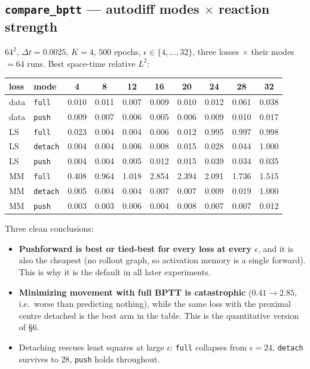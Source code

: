 \documentclass[11pt]{article}
\newcommand{\dt}{\Delta t}
\begin{document}
\subsection{\texttt{compare\_bptt} --- autodiff modes $\times$ reaction strength}
\label{sec:exp-bptt}
$64^2$, $\dt=0.0025$, $K=4$, $500$ epochs, $\epsilon\in\{4,\dots,32\}$, three losses $\times$ their
modes $=64$ runs. Best space-time relative $L^2$:
\begin{center}
\begin{tabular}{llcccccccc}
\hline
loss & mode & 4 & 8 & 12 & 16 & 20 & 24 & 28 & 32 \\
\hline
data & \texttt{full}   & 0.010 & 0.011 & 0.007 & 0.009 & 0.010 & 0.012 & 0.061 & 0.038 \\
data & \texttt{push}   & 0.009 & 0.007 & 0.006 & 0.005 & 0.006 & 0.009 & 0.010 & 0.017 \\
LS   & \texttt{full}   & 0.023 & 0.004 & 0.004 & 0.006 & 0.012 & 0.995 & 0.997 & 0.998 \\
LS   & \texttt{detach} & 0.004 & 0.004 & 0.006 & 0.008 & 0.015 & 0.028 & 0.044 & 1.000 \\
LS   & \texttt{push}   & 0.004 & 0.004 & 0.005 & 0.012 & 0.015 & 0.039 & 0.034 & 0.035 \\
MM   & \texttt{full}   & 0.408 & 0.964 & 1.018 & 2.854 & 2.394 & 2.091 & 1.736 & 1.515 \\
MM   & \texttt{detach} & 0.005 & 0.004 & 0.004 & 0.007 & 0.007 & 0.009 & 0.019 & 1.000 \\
MM   & \texttt{push}   & 0.003 & 0.003 & 0.006 & 0.004 & 0.008 & 0.007 & 0.007 & 0.012 \\
\hline
\end{tabular}
\end{center}
Three clean conclusions:
\begin{itemize}
   \item \textbf{Pushforward is best or tied-best for every loss at every $\epsilon$}, and it is
         also the cheapest (no rollout graph, so activation memory is a single forward). This is
         why it is the default in all later experiments.
   \item \textbf{Minimizing movement with full BPTT is catastrophic} ($0.41\to2.85$, i.e.\ worse
         than predicting nothing), while the same loss with the proximal centre detached is the
         best arm in the table. This is the quantitative version of \S6.
   \item Detaching rescues least squares at large $\epsilon$: \texttt{full} collapses from
         $\epsilon=24$, \texttt{detach} survives to $28$, \texttt{push} holds throughout.
\end{itemize}
\end{document}

